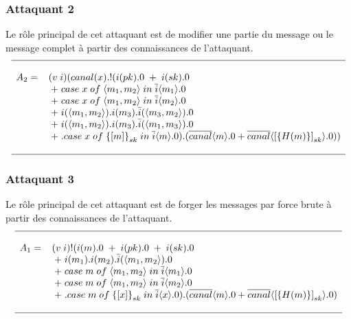 \documentclass[10pt,a4paper]{article}
\begin{document}
\subsubsection{Attaquant 2}
Le rôle principal de cet attaquant est de modifier une partie du message ou le message complet à partir des connaissances de l’attaquant.
\[ 
\begin{array}{l}
\hline
\\
A_{2}=\;\;\; (v\;i)(canal(x).!(i(pk).0\;+\;i(sk).0\\
	   \;\;\;\;\;\;\;\;\;\;\;\;\;+\;case\;x\;of\; \langle m_1,m_2\rangle\; in\; \overline{i}\langle m_1 \rangle.0\\
	   \;\;\;\;\;\;\;\;\;\;\;\;\;+\;case\;x\;of\;\langle m_1,m_2\rangle\; in\; \overline{i}\langle m_2 \rangle.0\\
	   \;\;\;\;\;\;\;\;\;\;\;\;\;+\;i(\langle m_1,m_2\rangle).i(m_3).\bar{i}(\langle m_3,m_2\rangle).0\\
	   \;\;\;\;\;\;\;\;\;\;\;\;\;+\;i(\langle m_1,m_2\rangle).i(m_3).\bar{i}(\langle m_1,m_3\rangle).0\\
	   \;\;\;\;\;\;\;\;\;\;\;\;\;+\;.case\; x\; of\; {\lbrace [m]\rbrace}_{sk}\;in\;\overline{i}\langle m\rangle.0).
	   (\overline{canal}\langle m\rangle.0 + \overline{canal}\langle{[\lbrace H(m)\rbrace]}_{sk} \rangle.0 ))\\	  
\\
\hline
\end{array}       
\]

\subsubsection{Attaquant 3}
Le rôle principal de cet attaquant est de forger les messages par force brute à partir des connaissances de l’attaquant.
\[ 
\begin{array}{l}
\hline
\\
A_{1}=\;\;\; (v\;i)!(i(m).0\;+\;i(pk).0\;+\;i(sk).0\\
	   \;\;\;\;\;\;\;\;\;\;\;\;\;+\;i(m_1).i(m_2).\bar{i}(\langle m_1,m_2\rangle).0\\
	   \;\;\;\;\;\;\;\;\;\;\;\;\;+\;case\;m\;of\; \langle m_1,m_2\rangle\; in\; \overline{i}\langle m_1 \rangle.0\\
	   \;\;\;\;\;\;\;\;\;\;\;\;\;+\;case\;m\;of\;\langle m_1,m_2\rangle\; in\; \overline{i}\langle m_2 \rangle.0\\
 \;\;\;\;\;\;\;\;\;\;\;\;\;+\;.case\; m\; of\; {\lbrace [x]\rbrace}_{sk}\;in\;\overline{i}\langle x\rangle.0).
	   (\overline{canal}\langle m\rangle.0 + \overline{canal}\langle{[\lbrace H(m)\rbrace]}_{sk} \rangle.0 )\\	  
\\
\hline
\end{array}       
\]
\end{document}
